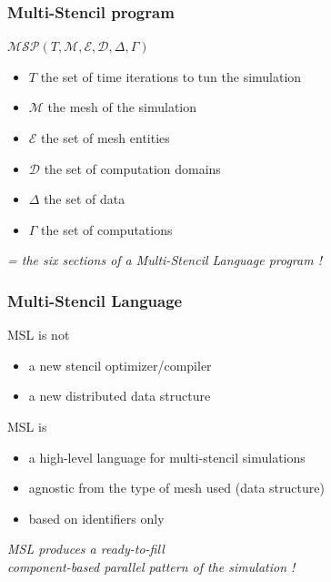 \documentclass{beamer}
\begin{document}
\begin{frame}
\frametitle{Multi-Stencil program}
\begin{center}
$\mathcal{MSP}(T,\mathcal{M},\mathcal{E},\mathcal{D},\Delta,\Gamma)$
\end{center}
\begin{itemize}
\item $T$ the set of time iterations to tun the simulation
\item $\mathcal{M}$ the mesh of the simulation
\item $\mathcal{E}$ the set of mesh entities
\item $\mathcal{D}$ the set of computation domains
\item $\Delta$ the set of data
\item $\Gamma$ the set of computations
\end{itemize}
\center \textit{= the six sections of a \emph{Multi-Stencil Language} program !}
\end{frame}

\begin{frame}
\frametitle{Multi-Stencil Language}
\begin{alertblock}{MSL is not}
\begin{itemize}
\item a new stencil optimizer/compiler
\item a new distributed data structure
\end{itemize}
\end{alertblock}
\begin{block}{MSL is}
\begin{itemize}
\item a high-level language for multi-stencil simulations
\item agnostic from the type of mesh used (data structure)
\item based on identifiers only
\end{itemize}
\end{block}
\begin{center}
\textit{MSL produces a ready-to-fill\\component-based parallel pattern of the simulation !}
\end{center}
\end{frame}
\end{document}
